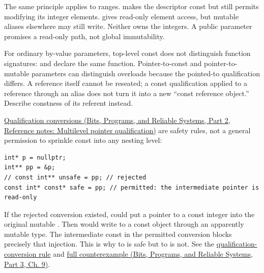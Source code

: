 The same principle applies to ranges.  makes the descriptor const but still permits modifying its integer elements.  gives read-only element access, but mutable aliases elsewhere may still write. Neither owns the integers. A public  parameter promises a read-only path, not global immutability.

For ordinary by-value parameters, top-level const does not distinguish function signatures:  and  declare the same function. Pointer-to-const and pointer-to-mutable parameters can distinguish overloads because the pointed-to qualification differs. A reference itself cannot be reseated; a const qualification applied to a reference through an alias does not turn it into a new ``const reference object.'' Describe constness of its referent instead.

\href{../01-Bits-Programs-and-Reliable-Systems-P02/main.pdf\#nameddest=appendix-5e1a7561cd98}{Qualification conversions (Bits, Programs, and Reliable Systems, Part 2, Reference notes: Multilevel pointer qualification)} are safety rules, not a general permission to sprinkle const into any nesting level:

\begin{verbatim}
int* p = nullptr;
int** pp = &p;
// const int** unsafe = pp; // rejected
const int* const* safe = pp; // permitted: the intermediate pointer is read-only
\end{verbatim}

If the rejected conversion existed,  could put a pointer to a const integer into the original mutable . Then  would write to a const object through an apparently mutable type. The intermediate const in the permitted conversion blocks precisely that injection. This is why  to  is safe but  to  is not. See the \href{https://eel.is/c++draft/conv.qual}{qualification-conversion rule} and \href{../01-Bits-Programs-and-Reliable-Systems-P03/main.pdf\#nameddest=01-foundations-i-ch011-c---qualification-safety-and-borrow-intervals}{full counterexample (Bits, Programs, and Reliable Systems, Part 3, Ch. 9)}.

